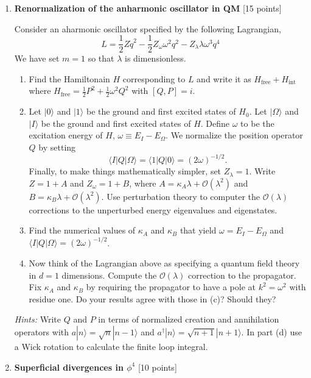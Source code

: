 \documentclass[12pt]{article}
\begin{document}
\begin{enumerate}
\vspace{.5em}

\item {\bf Renormalization of the anharmonic oscillator in QM} [15 points]

Consider an aharmonic oscillator specified by the following Lagrangian,
$$
L = \frac 12 Z \dot{q}^2 - \frac{1}{2} Z_\omega \omega^2 q^2 - Z_\lambda \lambda \omega^3 q^4
$$
We have set $m=1$ so that $\lambda$ is dimensionless.

\begin{enumerate}
\item Find the Hamiltonain $H$ corresponding to $L$ and write it as $H_\text{free} + H_\text{int}$ where $H_\text{free} = \frac 12 P^2 + \frac 12 \omega^2 Q^2$ with $[Q,P]=i$.
%
\item Let $|0\rangle$ and $|1\rangle$ be the ground and first excited states of $H_0$. Let $|\Omega\rangle$ and $| I\rangle$ be the ground and first excited states of $H$. Define $\omega$ to be the excitation energy of $H$, $\omega \equiv E_I - E_\Omega$. We normalize the position operator $Q$ by setting 
$$\langle I |Q |\Omega \rangle = \langle 1 |Q|0\rangle = (2\omega)^{-1/2}. $$
Finally, to make things mathematically simpler, set $Z_\lambda=1$. Write $Z=1+A$ and $Z_\omega=1+B$, where $A=\kappa_A\lambda + \mathcal O(\lambda^2)$ and $B=\kappa_B \lambda +\mathcal O(\lambda^2)$. Use perturbation theory to computer the $\mathcal O(\lambda)$ corrections to the unperturbed energy eigenvalues and eigenstates.
%
\item Find the numerical values of $\kappa_A$ and $\kappa_B$ that yield $\omega=E_I-E_\Omega$ and $\langle I | Q |\Omega \rangle = (2\omega)^{-1/2}$.
%
\item Now think of the Lagrangian above as specifying a quantum field theory in $d=1$ dimensions. Compute the $\mathcal O(\lambda)$ correction to the propagator. Fix $\kappa_A$ and $\kappa_B$ by requiring the propagator to have a pole at $k^2=\omega^2$ with residue one. Do your results agree with those in (c)? Should they?
\end{enumerate}
%
\textit{Hints:} Write $Q$ and $P$ in terms of normalized creation and annihilation operators with $a|n\rangle = \sqrt{n} |n-1\rangle$ and $a^\dag |n\rangle = \sqrt{n+1} |n+1\rangle$. In part (d) use a Wick rotation to calculate the finite loop integral.


\item {\bf Superficial divergences in $\phi^4$} [10 points]


\end{enumerate}
\end{document}
